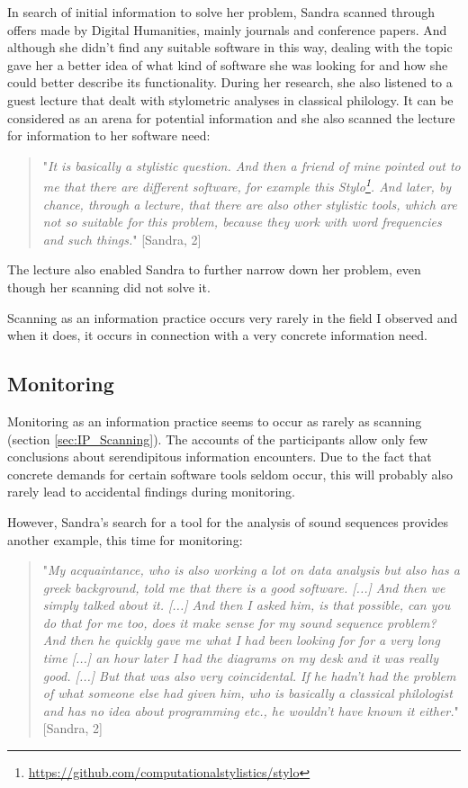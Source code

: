 \documentclass[12pt, a4paper, titlepage, oneside, abstract=true, toc=listof, toc=bibliography]{scrreprt}
\begin{document}
{In search of initial information to solve her problem, Sandra scanned through offers made by Digital Humanities, mainly journals and conference papers. And although she didn't find any suitable software in this way, dealing with the topic gave her a better idea of what kind of software she was looking for and how she could better describe its functionality. During her research, she also listened to a guest lecture that dealt with stylometric analyses in classical philology. It can be considered as an arena for potential information and she also scanned the lecture for information to her software need:

\begin{quotation}
"\textit{It is basically a stylistic question. And then a friend of mine pointed out to me that there are different software, for example this Stylo\footnote{\url{https://github.com/computationalstylistics/stylo}}. And later, by chance, through a lecture, that there are also other stylistic tools, which are not so suitable for this problem, because they work with word frequencies and such things.}" [Sandra, 2]
\end{quotation}

The lecture also enabled Sandra to further narrow down her problem, even though her scanning did not solve it.

Scanning as an information practice occurs very rarely in the field I observed and when it does, it occurs in connection with a very concrete information need. 

\subsection{Monitoring}
\label{sec:IP_Monitoring}
Monitoring as an information practice seems to occur as rarely as scanning (section \ref{sec:IP_Scanning}). The accounts of the participants allow only few conclusions about serendipitous information encounters. Due to the fact that concrete demands for certain software tools seldom occur, this will probably also rarely lead to accidental findings during monitoring. 

However, Sandra's search for a tool for the analysis of sound sequences provides another example, this time for monitoring:

\begin{quotation}
"\textit{My acquaintance, who is also working a lot on data analysis but also has a greek background, told me that there is a good software. [...] And then we simply talked about it. [...] And then I asked him, is that possible, can you do that for me too, does it make sense for my sound sequence problem? And then he quickly gave me what I had been looking for for a very long time [...] an hour later I had the diagrams on my desk and it was really good. [...] But that was also very coincidental. If he hadn't had the problem of what someone else had given him, who is basically a classical philologist and has no idea about programming etc., he wouldn't have known it either.}" [Sandra, 2]
\end{quotation}

}
\end{document}
